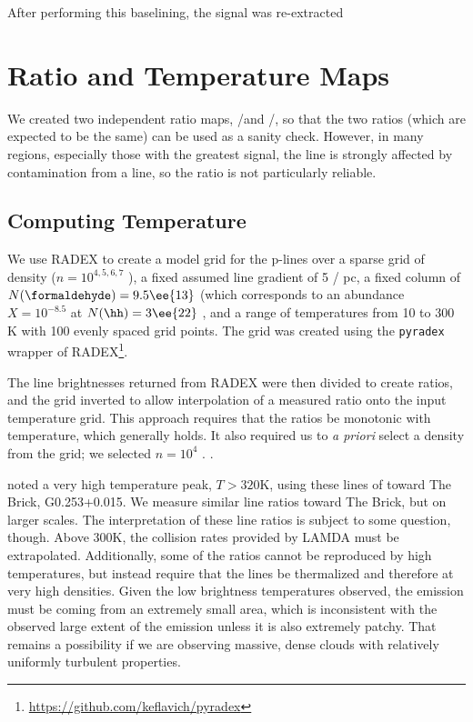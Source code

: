 After performing this baselining, the signal was re-extracted

\section{Ratio and Temperature Maps}
\label{sec:h2co}
We created two independent ratio maps, \threeohthree/\threetwotwo and
\threeohthree/\threetwoone, so that the two ratios (which are expected to be
the same) can be used as a sanity check.  However, in many regions, especially
those with the greatest signal, the \threetwotwo line is strongly affected by
contamination from a \methanol line, so the ratio is not particularly reliable.

\subsection{Computing Temperature}
We use RADEX \citet{van-Der-Tak2007a} to create a model grid for the
p-\formaldehyde lines over a sparse grid of density ($n=10^{4,5,6,7}$ \percc),
a fixed assumed line gradient of 5 \kms / pc, a fixed column of \formaldehyde
$N(\formaldehyde) = 9.5\ee{13}$ \persc (which corresponds to an abundance
$X=10^{-8.5}$ at $N(\hh) = 3\ee{22}$ \persc, and a range of temperatures from
10 to 300 K with 100 evenly spaced grid points.  The grid was created using
the \texttt{pyradex} wrapper of
RADEX\footnote{\url{https://github.com/keflavich/pyradex}}.

The line brightnesses returned from RADEX were then divided to create ratios,
and the grid inverted to allow interpolation of a measured ratio onto the input
temperature grid.   This approach requires that the ratios be monotonic with
temperature, which generally holds.  It also required us to \emph{a priori} select
a density from the grid; we selected $n=10^4$ \percc.  .

\citet{Johnston2014a} noted a very high temperature peak, $T>320$K, using these
lines of \formaldehyde toward The Brick, G0.253+0.015.  We measure similar line
ratios toward The Brick, but on larger scales.  The interpretation of these
line ratios is subject to some question, though.  Above 300K, the collision
rates provided by LAMDA \citep{Schoier2005a,Wiesenfeld2013a} must be
extrapolated.  Additionally, some of the ratios cannot be reproduced by high
temperatures, but instead require that the lines be thermalized and therefore
at very high densities.   Given the low brightness temperatures observed,
the emission must be coming from an extremely small area, which is inconsistent
with the observed large extent of the emission unless it is also extremely
patchy.  That remains a possibility if we are observing massive, dense clouds
with relatively uniformly turbulent properties.

